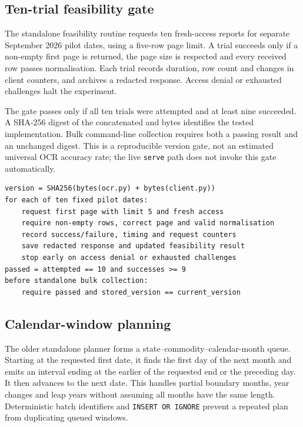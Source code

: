 \documentclass[12pt,a4paper,oneside]{report}
\numberwithin{equation}{chapter}
\numberwithin{figure}{chapter}
\numberwithin{table}{chapter}
\theoremstyle{definition}
\begin{document}
\subsection{Ten-trial feasibility gate}
The standalone feasibility routine requests ten fresh-access reports for separate September 2026 pilot dates, using a five-row page limit. A trial succeeds only if a non-empty first page is returned, the page size is respected and every received row passes normalisation. Each trial records duration, row count and changes in client counters, and archives a redacted response. Access denial or exhausted challenges halt the experiment.

The gate passes only if all ten trials were attempted and at least nine succeeded. A SHA-256 digest of the concatenated  and  bytes identifies the tested implementation. Bulk command-line collection requires both a passing result and an unchanged digest. This is a reproducible version gate, not an estimated universal OCR accuracy rate; the live \texttt{serve} path does not invoke this gate automatically.

\begin{lstlisting}[caption={Algorithm: standalone feasibility and version gate}]
version = SHA256(bytes(ocr.py) + bytes(client.py))
for each of ten fixed pilot dates:
    request first page with limit 5 and fresh access
    require non-empty rows, correct page and valid normalisation
    record success/failure, timing and request counters
    save redacted response and updated feasibility result
    stop early on access denial or exhausted challenges
passed = attempted == 10 and successes >= 9
before standalone bulk collection:
    require passed and stored_version == current_version
\end{lstlisting}

\subsection{Calendar-window planning}
The older standalone planner forms a state--commodity--calendar-month queue. Starting at the requested first date, it finds the first day of the next month and emits an interval ending at the earlier of the requested end or the preceding day. It then advances to the next date. This handles partial boundary months, year changes and leap years without assuming all months have the same length. Deterministic batch identifiers and \texttt{INSERT OR IGNORE} prevent a repeated plan from duplicating queued windows.
\end{document}
